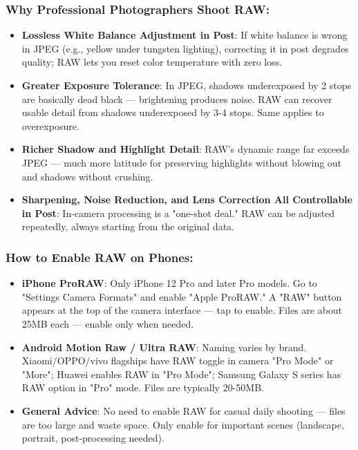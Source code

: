 \subsubsection*{Why Professional Photographers Shoot RAW:}

\begin{itemize}
  \item \textbf{Lossless White Balance Adjustment in Post}: If white balance is wrong in JPEG (e.g., yellow under tungsten lighting), correcting it in post degrades quality; RAW lets you reset color temperature with zero loss.
  \item \textbf{Greater Exposure Tolerance}: In JPEG, shadows underexposed by 2 stops are basically dead black — brightening produces noise. RAW can recover usable detail from shadows underexposed by 3-4 stops. Same applies to overexposure.
  \item \textbf{Richer Shadow and Highlight Detail}: RAW's dynamic range far exceeds JPEG — much more latitude for preserving highlights without blowing out and shadows without crushing.
  \item \textbf{Sharpening, Noise Reduction, and Lens Correction All Controllable in Post}: In-camera processing is a "one-shot deal." RAW can be adjusted repeatedly, always starting from the original data.
\end{itemize}

\subsubsection*{How to Enable RAW on Phones:}

\begin{itemize}
  \item \textbf{iPhone ProRAW}: Only iPhone 12 Pro and later Pro models. Go to "Settings Camera Formats" and enable "Apple ProRAW." A "RAW" button appears at the top of the camera interface — tap to enable. Files are about 25MB each — enable only when needed.
  \item \textbf{Android Motion Raw / Ultra RAW}: Naming varies by brand. Xiaomi/OPPO/vivo flagships have RAW toggle in camera "Pro Mode" or "More"; Huawei enables RAW in "Pro Mode"; Samsung Galaxy S series has RAW option in "Pro" mode. Files are typically 20-50MB.
  \item \textbf{General Advice}: No need to enable RAW for casual daily shooting — files are too large and waste space. Only enable for important scenes (landscape, portrait, post-processing needed).
\end{itemize}

